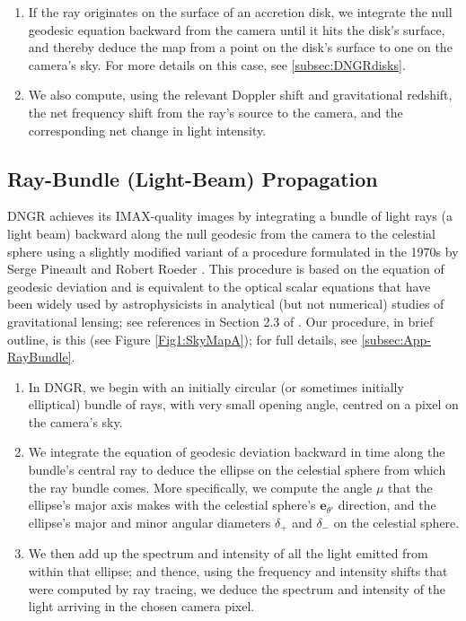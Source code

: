\documentclass[12pt]{iopart}
\newcommand{\mb}[1]{{\mathbf#1}} %
\begin{document}
\begin{enumerate}
\item
If the ray originates on the surface of an accretion disk, we integrate the null geodesic
equation backward from the camera until it hits the disk's surface, and thereby 
deduce the map from a point on the disk's surface to one on the camera's sky.  For
more details on this case, see \ref{subsec:DNGRdisks}.
\item
We also compute, using the relevant Doppler shift and gravitational redshift, the
net frequency shift from the ray's source to the camera, and the corresponding net
change in light intensity.
\end{enumerate}

\subsection{Ray-Bundle (Light-Beam) Propagation}
\label{subsec:RayBundle}

DNGR achieves its IMAX-quality images by integrating a bundle of light rays (a light beam) backward
along the null geodesic from the camera to the celestial sphere 
using a slightly modified variant of a procedure
formulated in the 1970s by Serge Pineault and Robert Roeder \cite{PR1,PR2}.
This procedure is based on the equation of geodesic deviation and is
equivalent to the optical scalar equations \cite{Ehlers} that have
been widely used by astrophysicists in analytical (but not numerical) studies of gravitational lensing; see references
in Section 2.3 of \cite{Perlick}.
Our procedure, in brief outline, is this (see Figure \ref{Fig1:SkyMapA}); for full details,
see \ref{subsec:App-RayBundle}.
\begin{enumerate}
\item
In DNGR, we begin with an initially circular
(or sometimes initially elliptical) bundle of rays, with very small opening
angle, 
centred on a pixel on the camera's sky.
\item 
We  integrate the equation of geodesic
deviation backward in time along the bundle's central ray to deduce
the ellipse on the celestial sphere from which the ray bundle comes.  More 
specifically, we compute the angle $\mu$ that the ellipse's major axis makes with the
celestial sphere's $\mb e_{\theta'}$ direction, and the ellipse's major and
minor angular diameters $\delta_+$ and $\delta_-$ on the celestial sphere.  
\item
We then add up the spectrum and intensity of all the light emitted from within that ellipse;  and thence, using the
frequency and intensity shifts that were computed by ray tracing, we deduce the spectrum and intensity of the light arriving in the chosen camera pixel.
\end{enumerate}
\end{document}
